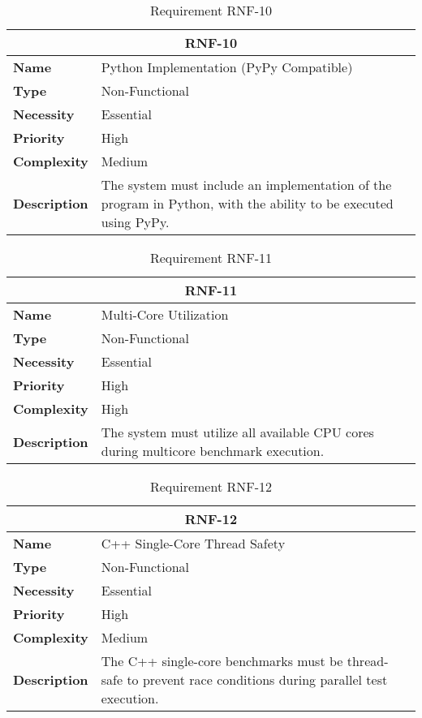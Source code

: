 \begin{table}[H]
    \centering
    \begin{tabular}{l p{10cm}}
        \toprule
        \multicolumn{2}{c}{\textbf{RNF-10}} \\
        \toprule
        \textbf{Name}         & Python Implementation (PyPy Compatible) \\
        \textbf{Type}         & Non-Functional \\
        \textbf{Necessity}    & Essential \\
        \textbf{Priority}     & High \\
        \textbf{Complexity}   & Medium \\
        \textbf{Description}  & The system must include an implementation of the program in Python, with the ability to be executed using PyPy. \\
        \bottomrule
    \end{tabular}
\caption{Requirement RNF-10}\label{tab:rnf-10}
\end{table}


\begin{table}[H]
    \centering
    \begin{tabular}{l p{10cm}}
        \toprule
        \multicolumn{2}{c}{\textbf{RNF-11}} \\
        \toprule
        \textbf{Name}         & Multi-Core Utilization \\
        \textbf{Type}         & Non-Functional \\
        \textbf{Necessity}    & Essential \\
        \textbf{Priority}     & High \\
        \textbf{Complexity}   & High \\
        \textbf{Description}  & The system must utilize all available CPU cores during multicore benchmark execution. \\
        \bottomrule
    \end{tabular}
\caption{Requirement RNF-11}\label{tab:rnf-11}
\end{table}

\begin{table}[H]
    \centering
    \begin{tabular}{l p{10cm}}
        \toprule
        \multicolumn{2}{c}{\textbf{RNF-12}} \\
        \toprule
        \textbf{Name}         & C++ Single-Core Thread Safety \\
        \textbf{Type}         & Non-Functional \\
        \textbf{Necessity}    & Essential \\
        \textbf{Priority}     & High \\
        \textbf{Complexity}   & Medium \\
        \textbf{Description}  & The C++ single-core benchmarks must be thread-safe to prevent race conditions during parallel test execution. \\
        \bottomrule
    \end{tabular}
\caption{Requirement RNF-12}\label{tab:rnf-12}
\end{table}

